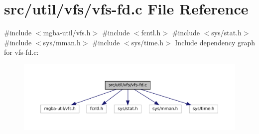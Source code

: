 \hypertarget{vfs-fd_8c}{}\section{src/util/vfs/vfs-\/fd.c File Reference}
\label{vfs-fd_8c}
{\ttfamily \#include $<$mgba-\/util/vfs.\+h$>$}\newline
{\ttfamily \#include $<$fcntl.\+h$>$}\newline
{\ttfamily \#include $<$sys/stat.\+h$>$}\newline
{\ttfamily \#include $<$sys/mman.\+h$>$}\newline
{\ttfamily \#include $<$sys/time.\+h$>$}\newline
Include dependency graph for vfs-\/fd.c\+:
\nopagebreak
\begin{figure}[H]
\begin{center}
\leavevmode
\includegraphics[width=350pt]{vfs-fd_8c__incl}
\end{center}
\end{figure}
